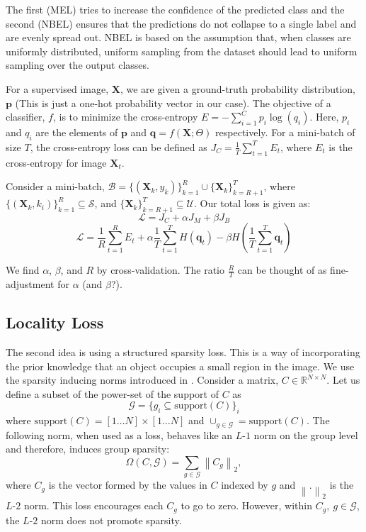 \documentclass[runningheads]{llncs}
\begin{document}
The first (MEL) tries to increase the confidence of the predicted class and the second (NBEL)
ensures that the predictions do not collapse to a single label and are evenly spread out. NBEL
is based on the assumption that, when classes are uniformly distributed, uniform sampling from the
dataset should lead to uniform sampling over the output classes.

For a supervised image, $\textbf{X}$, we are given a ground-truth probability distribution, $\mathbf{p}$ (This is
just a one-hot probability vector in our case). The objective of a classifier, $f$, is to minimize the
cross-entropy $E = -\sum_{i=1}^{C}p_i \log(q_i)$. Here, $p_i$ and $q_i$
are the elements of $\mathbf{p}$ and $\mathbf{q} = f(\mathbf{X}; \Theta)$ respectively. For a
mini-batch of size $T$, the cross-entropy loss can be defined as $J_C = \frac{1}{T} \sum_{t=1}^{T}
E_t$, where $E_t$ is the cross-entropy for image $\mathbf{X}_t$.

Consider a mini-batch, $\mathcal{B} =
\{(\mathbf{X}_k, y_k)\}_{k=1}^R \cup \{\mathbf{X}_k\}_{k=R+1}^T$, where $\{(\mathbf{X}_k,
k_i)\}_{k=1}^{R} \subseteq \mathcal{S}$, and $\{\mathbf{X}_k\}_{k=R+1}^{T} \subseteq \mathcal{U}$. Our total loss
is given as:
\begin{equation}
	\mathcal{L} = J_C + \alpha J_M + \beta J_B
\end{equation}
\begin{equation}
	\mathcal{L} = \frac{1}{R} \sum_{t=1}^{R} E_t + \alpha \frac{1}{T}\sum_{t=1}^{T}H(\mathbf{q}_t) -
	\beta H(\frac{1}{T}\sum_{t=1}^{T}\mathbf{q}_t)
\end{equation}

We find $\alpha$, $\beta$, and $R$ by cross-validation. The ratio $\frac{R}{T}$ can be thought of as
fine-adjustment for $\alpha$ (and $\beta$?).


\subsection{Locality Loss}
The second idea is using a structured sparsity loss. This is a way of incorporating the prior knowledge
that an object occupies a small region in the image. We use the sparsity inducing norms introduced in
\cite{groupsparsity,sparsepca}. Consider a matrix, $C \in \mathbb{R}^{N \times
N}$. Let us define a subset of the power-set of the support of $C$ as
\begin{equation}
	\mathcal{G} = \{g_i \subseteq \textrm{support}(C)\}_i
\end{equation}
where $\textrm{support}(C) = [1 \dots N] \times [1 \dots N]$ and $\cup_{g \in \mathcal{G}} = \textrm{support}(C)$. The following norm, when used as a
loss, behaves like an $L$-$1$ norm on the group level and therefore, induces group sparsity:
\begin{equation}
	\Omega (C, \mathcal{G}) = \sum_{g \in \mathcal{G}} \left\lVert C_g \right\rVert _2,
\end{equation}
where $C_g$ is the vector formed by the values in $C$ indexed by $g$ and $\left\lVert . \right\rVert_2$ is
the $L$-$2$ norm. This loss encourages each $C_g$ to go to zero. However, within $C_g,~g
\in \mathcal{G}$, the $L$-$2$ norm does not promote sparsity.
\end{document}
